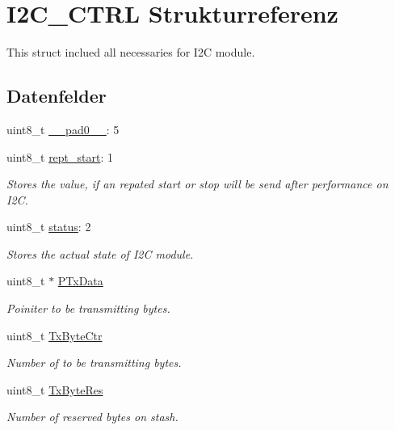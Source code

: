 \hypertarget{struct_i2_c___c_t_r_l}{}\section{I2\+C\+\_\+\+C\+T\+R\+L Strukturreferenz}
\label{struct_i2_c___c_t_r_l}


This struct inclued all necessaries for I2\+C module.  


\subsection*{Datenfelder}
\begin{DoxyCompactItemize}
\item 
uint8\+\_\+t \hyperlink{struct_i2_c___c_t_r_l_a8b4eebe79ded0459acec2f4950102ba3}{\+\_\+\+\_\+pad0\+\_\+\+\_\+}\+: 5
\item 
uint8\+\_\+t \hyperlink{struct_i2_c___c_t_r_l_a374bcaa6a416b8601564a1053ddf78bb}{rept\+\_\+start}\+: 1
\begin{DoxyCompactList}\small\item\em Stores the value, if an repated start or stop will be send after performance on I2\+C. \end{DoxyCompactList}\item 
uint8\+\_\+t \hyperlink{struct_i2_c___c_t_r_l_ade818037fd6c985038ff29656089758d}{status}\+: 2
\begin{DoxyCompactList}\small\item\em Stores the actual state of I2\+C module. \end{DoxyCompactList}\item 
uint8\+\_\+t $\ast$ \hyperlink{struct_i2_c___c_t_r_l_af294cab6f89af5bd936b709e202c8421}{P\+Tx\+Data}
\begin{DoxyCompactList}\small\item\em Poiniter to be transmitting bytes. \end{DoxyCompactList}\item 
uint8\+\_\+t \hyperlink{struct_i2_c___c_t_r_l_aec22639ad7dc7eed52b3e116ea3223fe}{Tx\+Byte\+Ctr}
\begin{DoxyCompactList}\small\item\em Number of to be transmitting bytes. \end{DoxyCompactList}\item 
uint8\+\_\+t \hyperlink{struct_i2_c___c_t_r_l_a28b787f8db17314755d031d75ec38017}{Tx\+Byte\+Res}
\begin{DoxyCompactList}\small\item\em Number of reserved bytes on stash. \end{DoxyCompactList}\item 

\end{DoxyCompactItemize}
